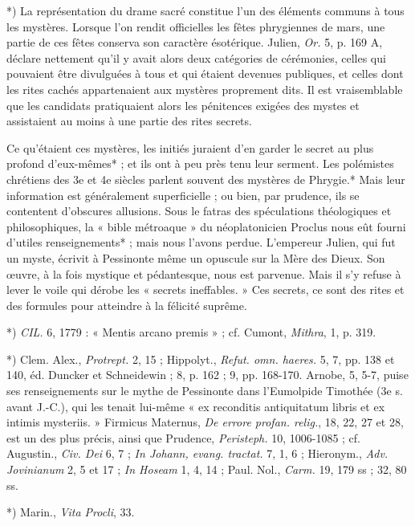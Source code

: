\documentclass[a4paper, 11pt, oneside, polutonikogreek, french]{article}
\begin{document}
*) La représentation du drame sacré constitue l'un des éléments communs à tous les mystères. Lorsque l'on rendit officielles les fêtes phrygiennes de mars, une partie de ces fêtes conserva son caractère ésotérique. Julien, \emph{Or.} 5, p. 169 A, déclare nettement qu'il y avait alors deux catégories de cérémonies, celles qui pouvaient être divulguées à tous et qui étaient devenues publiques, et celles dont les rites cachés appartenaient aux mystères proprement dits. Il est vraisemblable que les candidats pratiquaient alors les pénitences exigées des mystes et assistaient au moins à une partie des rites secrets.

Ce qu'étaient ces mystères, les initiés juraient d'en garder le secret au plus profond d'eux-mêmes* ; et ils ont à peu près tenu leur serment. Les polémistes chrétiens des 3e et 4e siècles parlent souvent des mystères de Phrygie.* Mais leur information est généralement superficielle ; ou bien, par prudence, ils se contentent d'obscures allusions. Sous le fatras des spéculations théologiques et philosophiques, la « bible métroaque » du néoplatonicien Proclus nous eût fourni d'utiles renseignements* ; mais nous l'avons perdue. L'empereur Julien, qui fut un myste, écrivit à Pessinonte même un opuscule sur la Mère des Dieux. Son œuvre, à la fois mystique et pédantesque, nous est parvenue. Mais il s'y refuse à lever le voile qui dérobe les « secrets ineffables. » Ces secrets, ce sont des rites et des formules pour atteindre à la félicité suprême.

*) \emph{CIL.} 6, 1779 : « Mentis arcano premis » ; cf. Cumont, \emph{Mithra}, 1, p. 319.

*) Clem. Alex., \emph{Protrept.} 2, 15 ; Hippolyt., \emph{Refut. omn. haeres.} 5, 7, pp. 138 et 140, éd. Duncker et Schneidewin ; 8, p. 162 ; 9, pp. 168-170. Arnobe, 5, 5-7, puise ses renseignements sur le mythe de Pessinonte dans l'Eumolpide Timothée (3e s. avant J.-C.), qui les tenait lui-même « ex reconditis antiquitatum libris et ex intimis mysteriis. » Firmicus Maternus, \emph{De errore profan. relig.}, 18, 22, 27 et 28, est un des plus précis, ainsi que Prudence, \emph{Peristeph.} 10, 1006-1085 ; cf. Augustin., \emph{Civ. Dei} 6, 7 ; \emph{In Johann, evang. tractat.} 7, 1, 6 ; Hieronym., \emph{Adv. Jovinianum} 2, 5 et 17 ; \emph{In Hoseam} 1, 4, 14 ; Paul. Nol., \emph{Carm.} 19, 179 ss ; 32, 80 ss.

*) Marin., \emph{Vita Procli}, 33.
\end{document}
